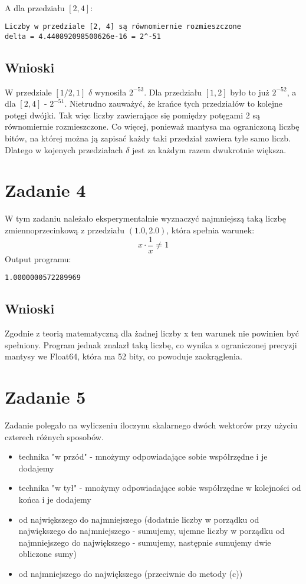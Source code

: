 \documentclass{article}
\begin{document}
\noindent \\ A dla przedziału $[2, 4]$:
\begin{verbatim}
Liczby w przedziale [2, 4] są równomiernie rozmieszczone
delta = 4.440892098500626e-16 = 2^-51
\end{verbatim}

\subsection*{Wnioski} W przedziale $[1/2, 1]$ $\delta$ wynosiła $2^{-53}$. Dla przedziału $[1, 2]$ było to już $2^{-52}$, a dla $[2, 4]$ - $2^{-51}$. Nietrudno zauważyć, że krańce tych przedziałów to kolejne potęgi dwójki. Tak więc liczby zawierające się pomiędzy potęgami 2 są równomiernie rozmieszczone. Co więcej, ponieważ mantysa ma ograniczoną liczbę bitów, na której można ją zapisać każdy taki przedział zawiera tyle samo liczb. Dlatego w kojenych przedziałach $\delta$ jest za każdym razem dwukrotnie większa.


\section{Zadanie 4}
W tym zadaniu należało eksperymentalnie wyznaczyć najmniejszą taką liczbę zmiennoprzecinkową z przedziału $(1.0, 2.0)$, która spełnia warunek:\\
\[
x \cdot \frac{1}{x} \neq 1
\]
Output programu:
\begin{verbatim}
1.0000000572289969
\end{verbatim}
\subsection*{Wnioski} Zgodnie z teorią matematyczną dla żadnej liczby x ten warunek nie powinien być spełniony. Program jednak znalazł taką liczbę, co wynika z ograniczonej precyzji mantysy we Float64, która ma 52 bity, co powoduje zaokrąglenia.

\section{Zadanie 5}
Zadanie polegało na wyliczeniu iloczynu skalarnego dwóch wektorów przy użyciu czterech różnych sposobów.\\
\begin{itemize}
    \item technika "w przód" - mnożymy odpowiadające sobie współrzędne i je dodajemy
    \item technika "w tył" - mnożymy odpowiadające sobie współrzędne w kolejności od końca i je dodajemy
    \item od największego do najmniejszego (dodatnie liczby w porządku od największego
    do najmniejszego - sumujemy, ujemne liczby w porządku od najmniejszego do największego - sumujemy, następnie sumujemy dwie obliczone sumy)
    \item od najmniejszego do największego (przeciwnie do metody (c))
\end{itemize}
\end{document}
